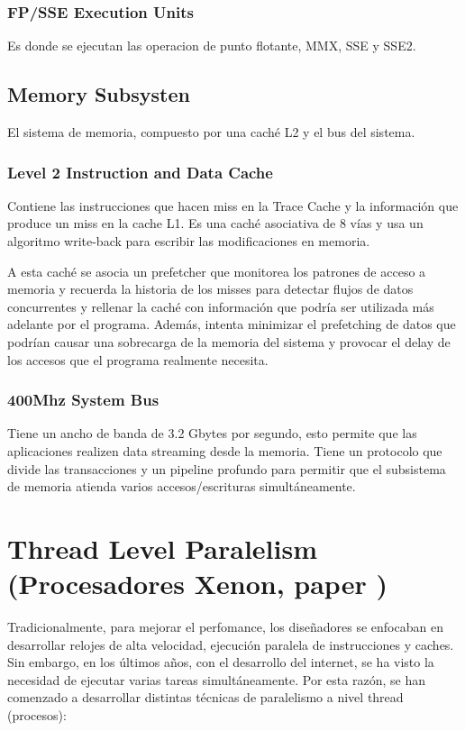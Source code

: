 \subsubsection*{FP/SSE Execution Units}
Es donde se ejecutan las operacion de punto flotante, MMX, SSE y SSE2.
\subsection{Memory Subsysten}
El sistema de memoria, compuesto por una caché L2 y el bus del sistema.

\subsubsection*{Level 2 Instruction and Data Cache}
Contiene las instrucciones que hacen miss en la Trace Cache y la información que produce un miss en la cache L1. Es una caché asociativa de 8 vías y usa un algoritmo write-back para escribir las modificaciones en memoria.

A esta caché se asocia un prefetcher que monitorea los patrones de acceso a memoria y recuerda la historia de los misses para detectar flujos de datos concurrentes y rellenar la caché con información que podría ser utilizada más adelante por el programa. Además, intenta minimizar el prefetching de datos que podrían causar una sobrecarga de la memoria del sistema y provocar el delay de los accesos que el programa realmente necesita.

\subsubsection*{400Mhz System Bus}
Tiene un ancho de banda de 3.2 Gbytes por segundo, esto permite que las aplicaciones realizen data streaming desde la memoria. Tiene un protocolo que divide las transacciones y un pipeline profundo para permitir que el subsistema de memoria atienda varios accesos/escrituras simultáneamente. 

\newpage
\section{Thread Level Paralelism (Procesadores Xenon, paper \cite{marr02threads})}

Tradicionalmente, para mejorar el perfomance, los diseñadores se enfocaban en desarrollar relojes de alta velocidad, ejecución paralela de instrucciones y caches. Sin embargo, en los últimos años, con el desarrollo del internet, se ha visto la necesidad de ejecutar varias tareas simultáneamente. Por esta razón, se han comenzado a desarrollar distintas técnicas de paralelismo a nivel thread (procesos):


